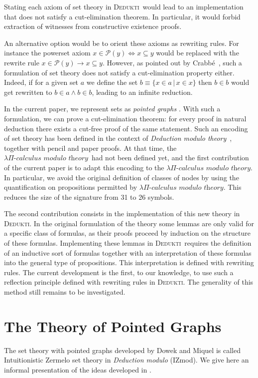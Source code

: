 \documentclass[submission,copyright,creativecommons]{eptcs}
\def\lra{\longrightarrow}
\newcommand{\dedukti}{\textsc{Dedukti}}
\newcommand{\lpcm}{$\lambda \Pi\textit{-calculus modulo theory}$}
\begin{document}
Stating each axiom of set theory in \dedukti ~would lead to an implementation that does not satisfy a cut-elimination theorem. In particular, it would forbid extraction of witnesses from constructive existence proofs.

An alternative option would be to orient these axioms as rewriting rules. For instance the powerset axiom $x \in \mathcal{P}(y) \Leftrightarrow x \subseteq y$ would be replaced with the rewrite rule $x \in \mathcal{P}(y) \lra x \subseteq y$. However, as pointed out by Crabbé~\cite{crabbe}, such a formulation of set theory does not satisfy a cut-elimination property either. Indeed, if for a given set $a$ we define the set $b\equiv\{x\in a\,|\,x\in x\}$ then $b\in b$ would get rewritten to $b\in a\wedge b\in b$, leading to an infinite reduction.

In the current paper, we represent sets as \textit{pointed graphs} \cite{pointed}. With such a formulation, we can prove a cut-elimination theorem: for every proof in natural deduction there exists a cut-free proof of the same statement. Such an encoding of set theory has been defined in the context of \textit{Deduction modulo theory}~\cite{zermodulo}, together with pencil and paper proofs. At that time, the \lpcm ~had not been defined yet, and the first contribution of the current paper is to adapt this encoding to the \lpcm. In particular, we avoid the original definition of classes of nodes by using the quantification on propositions permitted by \lpcm. This reduces the size of the signature from 31 to 26 symbols.

The second contribution consists in the implementation of this new theory in \dedukti. In the original formulation of the theory some lemmas are only valid for a specific class of formulas, as their proofs proceed by induction on the structure of these formulas. Implementing these lemmas in \dedukti ~requires the definition of an inductive sort of formulas together with an interpretation of these formulas into the general type of propositions. This interpretation is defined with rewriting rules. The current development is the first, to our knowledge, to use such a reflection principle defined with rewriting rules in \dedukti. The generality of this method still remains to be investigated.

\section{The Theory of Pointed Graphs}

The set theory with pointed graphs developed by Dowek and Miquel is called Intuitionistic Zermelo set theory in \textit{Deduction modulo} (IZmod). We give here an informal presentation of the ideas developed in \cite{zermodulo}.
\end{document}
